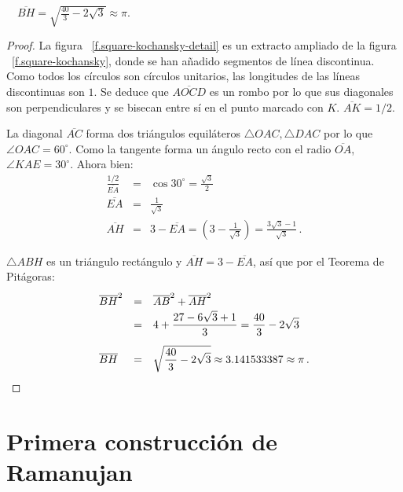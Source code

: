 \begin{theorem}
$\quad\overline{BH}=\sqrt{\displaystyle\frac{40}{3}-2\sqrt{3}}\approx \pi$.
\end{theorem}
\begin{proof}
La figura ~\ref{f.square-kochansky-detail} es un extracto ampliado de la figura ~\ref{f.square-kochansky}, donde se han añadido segmentos de línea discontinua. Como todos los círculos son círculos unitarios, las longitudes de las líneas discontinuas son $1$. Se deduce que $\overline{AOCD}$ es un rombo por lo que sus diagonales son perpendiculares y se bisecan entre sí en el punto marcado con $K$. $\overline{AK}=1/2$.

La diagonal $\overline{AC}$ forma dos triángulos equiláteros $\triangle OAC, \triangle DAC$ por lo que $\angle OAC=60^\circ$. Como la tangente forma un ángulo recto con el radio $\overline{OA}$, $\angle KAE=30^\circ$. Ahora bien:
\begin{displaymath}
\renewcommand{\arraystretch}{1.5}
\begin{array}{lcl}
\displaystyle\frac{1/2}{\overline{EA}}&=&
\cos 30^\circ=\displaystyle\frac{\sqrt{3}}{2}\\
\overline{EA}&=&\displaystyle\frac{1}{\sqrt{3}}\\
\overline{AH}&=&3-\overline{EA}=\left(3-\displaystyle\frac{1}{\sqrt{3}}\right)
=\displaystyle\frac{3\sqrt{3}-1}{\sqrt{3}}\,.
\end{array}
\end{displaymath}

$\triangle ABH$ es un triángulo rectángulo y $\overline{AH}=3-\overline{EA}$, así que por el Teorema de Pitágoras:
\begin{displaymath}
\renewcommand{\arraystretch}{1.5}
\begin{array}{lcl}
\overline{BH}^2&=&\overline{AB}^2+\overline{AH}^2\\
&=&4+\displaystyle\frac{27 -6\sqrt{3}+1}{3}=\frac{40}{3}-2\sqrt{3}\\
\overline{BH}&=&\rule{0pt}{25pt}\sqrt{\displaystyle\frac{40}{3}-2\sqrt{3}}\approx 3.141533387\approx \pi\,.
\end{array}
\end{displaymath}
\end{proof}




\section{Primera construcción de Ramanujan}\label{s.square-ramanujan-first}

